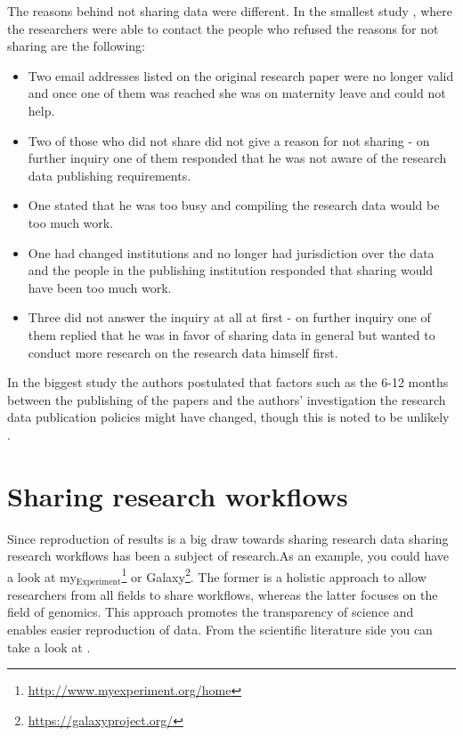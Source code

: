 The reasons behind not sharing data were different. In the smallest study \cite{savage2009empirical},
where the researchers were able to contact the people who refused the reasons
for not sharing are the following:

\begin{itemize}
    \item Two email addresses listed on the original research paper were no
          longer valid and once one of them was reached she was on maternity
          leave and could not help.
    \item Two of those who did not share did not give a reason for not sharing - on further
          inquiry one of them responded that he was not aware of the research
          data publishing requirements.
    \item One stated that he was too busy and compiling the research data
          would be too much work.
    \item One had changed institutions and no longer had jurisdiction over the
          data and the people in the publishing institution responded that
          sharing would have been too much work.
    \item Three did not answer the inquiry at all at first - on further inquiry
          one of them replied that he was in favor of sharing data in general
          but wanted to conduct more research on the research data himself
          first.
\end{itemize}

In the biggest study the authors postulated that factors such as the 6-12
months between the publishing of the papers and the authors' investigation
the research data publication policies might have changed, though this is noted
to be unlikely \cite{alsheikh2011public}.

\section{Sharing research workflows}

Since reproduction of results is a big draw towards sharing research data
sharing research workflows has been a subject of research.As an example, you
could have a look at my\({}_{\mbox{Experiment}}\)\footnote{\url{http://www.myexperiment.org/home}}
or Galaxy\footnote{\url{https://galaxyproject.org/}}.
The former is a holistic approach to allow researchers from all
fields to share workflows, whereas the latter focuses on the field of genomics.
This approach promotes the transparency of science and enables
easier reproduction of data. From the scientific literature side you can take
a look at \cite{goecks2010galaxy, DBLP:journals/fgcs/RoureGS09}.

